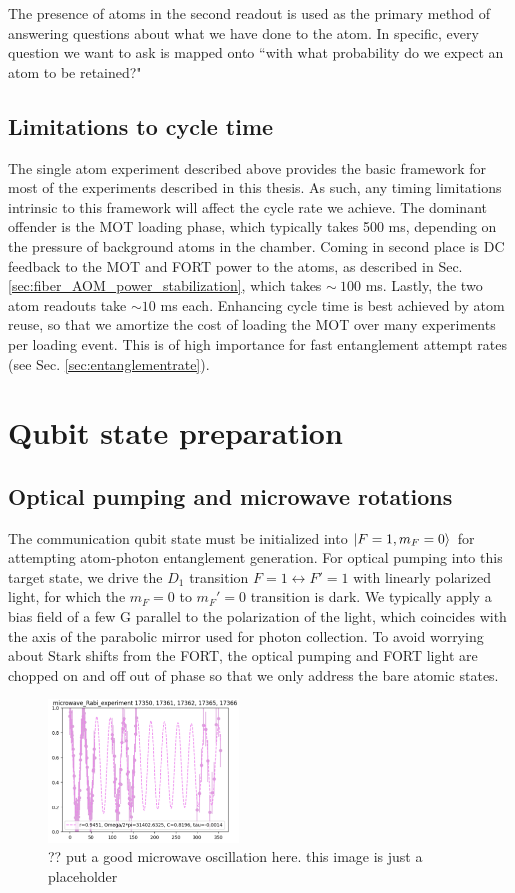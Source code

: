 The presence of atoms in the second readout is used as the primary method of answering questions about what we have done to the atom. In specific, every question we want to ask is mapped onto ``with what probability do we expect an atom to be retained?"

\subsection{Limitations to cycle time}
The single atom experiment described above provides the basic framework for most of the experiments described in this thesis. As such, any timing limitations intrinsic to this framework will affect the cycle rate we achieve. The dominant offender is the MOT loading phase, which typically takes 500 ms, depending on the pressure of background atoms in the chamber. Coming in second place is DC feedback to the MOT and FORT power to the atoms, as described in Sec. \ref{sec:fiber_AOM_power_stabilization}, which takes $\sim~100$ ms. Lastly, the two atom readouts take $\sim10$ ms each. Enhancing cycle time is best achieved by atom reuse, so that we amortize the cost of loading the MOT over many experiments per loading event. This is of high importance for fast entanglement attempt rates (see Sec. \ref{sec:entanglementrate}).

\section{Qubit state preparation}

\subsection{Optical pumping and microwave rotations}

The communication qubit state must be initialized into $\ket{F=1,m_F=0}$ for attempting
atom-photon entanglement generation. For optical pumping into this target state, we drive the $D_1$ transition $F=1 \leftrightarrow F'=1$ with linearly polarized light, for which the $m_F=0$ to $m_F'=0$ transition is dark. We typically apply a bias field of a few G parallel to the polarization of the light, which coincides with the axis of the parabolic mirror used for photon collection. To avoid worrying about Stark shifts from the FORT, the optical pumping and FORT light are chopped on and off out of phase so that we only address the bare atomic states. 
\begin{figure}[!h]
    \centering
    \includegraphics[width=0.45\textwidth]{Images/microwave_Rabi_202409xx.png}
    \caption{?? put a good microwave oscillation here. this image is just a placeholder}
    \label{fig:microwave_oscillation}
\end{figure}

